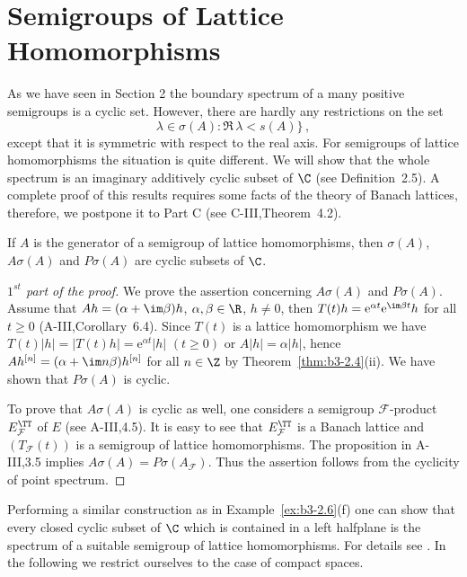 \section{Semigroups of Lattice Homomorphisms}
As we have seen in Section 2 the boundary spectrum of a many positive semigroups is a cyclic set.
However, there are hardly any restrictions on the set 
\[
\lambda \in \sigma(A) : \Re\,\lambda  < s(A)\}\,,
\] 
except that it is symmetric with respect to the real axis.
For semigroups of lattice homomorphisms the situation is quite different.
We will show that the whole spectrum is an imaginary additively cyclic subset of $\C$ (see Definition~2.5).
A complete proof of this results requires some facts of the theory of Banach lattices, therefore, we postpone it to Part C (see C-III,Theorem~4.2).
\begin{theorem}\label{thm:b3-4.1}
	If $A$ is the generator of a semigroup of lattice homomorphisms, then $\sigma(A)$, $A\sigma(A)$ and $P\sigma(A)$ are cyclic subsets of $\C$.
\end{theorem}
\begin{proof}[$1^{st}$ part of the proof]
	We prove the assertion concerning $A\sigma(A)$ and $P\sigma(A)$.
	Assume that $Ah = (\alpha + \im\beta)h$, $\alpha,\beta \in \R$, $h \neq 0$, then $T(t)h = \mathrm{e}^{\alpha t}\mathrm{e}^{\im\beta  t}h$ for all $t \geq 0$ (A-III,Corollary~6.4).
	Since $T(t)$ is a lattice homomorphism we have $T(t)|h| = |T(t)h| = \mathrm{e}^{\alpha t}|h|$ $(t \geq 0)$ or $A|h| = \alpha|h|$, hence $Ah^{[n]} = (\alpha + \im n\beta)h^{[n]}$ for all $n \in \Z$ by Theorem~\ref{thm:b3-2.4}(ii).
	We have shown that $P\sigma(A)$ is cyclic.
	
	To prove that $A\sigma(A)$ is cyclic as well, one considers a semigroup $\mathcal{F}$-product $E_{\mathcal{F}}^{\TT}$ of $E$ (see A-III,4.5).
	It is easy to see that $E_{\mathcal{F}}^{\TT}$ is a Banach lattice 
	and $(T_{\mathcal{F}}(t))$ is a semigroup of lattice homomorphisms.
	The proposition in A-III,3.5 implies $A\sigma(A) = P\sigma(A_{\mathcal{F}})$.
	Thus the assertion follows from the cyclicity of point spectrum.
\end{proof}
Performing a similar construction as in Example~\ref{ex:b3-2.6}(f) one can show that every closed cyclic subset of $\C$  which is contained in a left half­plane is the spectrum of a suitable semigroup of lattice homomor­phisms. 
For details see \citet{derndingernagel:1979}. 
In the following we restrict ourselves to the case of compact spaces. 
